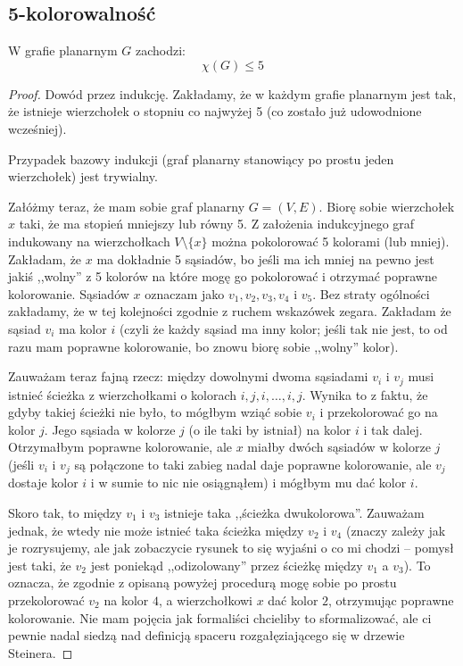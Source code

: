 \subsection{5-kolorowalność}
\begin{theorem}
	W grafie planarnym \(G\) zachodzi:
	\begin{equation}
		\chi(G) \leq 5
	\end{equation}
\end{theorem}


\begin{proof}
	Dowód przez indukcję. Zakładamy, że w każdym grafie planarnym jest tak, że istnieje wierzchołek o stopniu co najwyżej 5 (co zostało już udowodnione wcześniej).

	Przypadek bazowy indukcji (graf planarny stanowiący po prostu jeden wierzchołek) jest trywialny.

	Załóżmy teraz, że mam sobie graf planarny \(G = (V,E)\). Biorę sobie wierzchołek \(x\) taki, że ma stopień mniejszy lub równy 5. Z założenia indukcyjnego graf indukowany na wierzchołkach \(V \setminus \{x\}\) można pokolorować 5 kolorami (lub mniej). Zakładam, że \(x\) ma dokładnie 5 sąsiadów, bo jeśli ma ich mniej na pewno jest jakiś ,,wolny'' z 5 kolorów na które mogę go pokolorować i otrzymać poprawne kolorowanie. Sąsiadów \(x\) oznaczam jako \(v_1, v_2, v_3, v_4\) i \(v_5\). Bez straty ogólności zakładamy, że w tej kolejności zgodnie z ruchem wskazówek zegara. Zakładam że sąsiad \(v_i\) ma kolor \(i\) (czyli że każdy sąsiad ma inny kolor; jeśli tak nie jest, to od razu mam poprawne kolorowanie, bo znowu biorę sobie ,,wolny'' kolor).

	Zauważam teraz fajną rzecz: między dowolnymi dwoma sąsiadami \(v_i\) i \(v_j\) musi istnieć ścieżka z wierzchołkami o kolorach \(i, j, i, \dots, i, j\). Wynika to z faktu, że gdyby takiej ścieżki nie było, to mógłbym wziąć sobie \(v_i\) i przekolorować go na kolor \(j\). Jego sąsiada w kolorze \(j\) (o ile taki by istniał) na kolor \(i\) i tak dalej. Otrzymałbym poprawne kolorowanie, ale \(x\) miałby dwóch sąsiadów w kolorze \(j\) (jeśli \(v_i\) i \(v_j\) są połączone to taki zabieg nadal daje poprawne kolorowanie, ale \(v_j\) dostaje kolor \(i\) i w sumie to nic nie osiągnąłem) i mógłbym mu dać kolor \(i\).

	Skoro tak, to między \(v_1\) i \(v_3\) istnieje taka ,,ścieżka dwukolorowa''. Zauważam jednak, że wtedy nie może istnieć taka ścieżka między \(v_2\) i \(v_4\) (znaczy zależy jak je rozrysujemy, ale jak zobaczycie rysunek to się wyjaśni o co mi chodzi -- pomysł jest taki, że \(v_2\) jest poniekąd ,,odizolowany'' przez ścieżkę między \(v_1\) a \(v_3\)). To oznacza, że zgodnie z opisaną powyżej procedurą mogę sobie po prostu przekolorować \(v_2\) na kolor \(4\), a wierzchołkowi \(x\) dać kolor \(2\), otrzymując poprawne kolorowanie. Nie mam pojęcia jak formaliści chcieliby to sformalizować, ale ci pewnie nadal siedzą nad definicją spaceru rozgałęziającego się w drzewie Steinera.


\end{proof}
